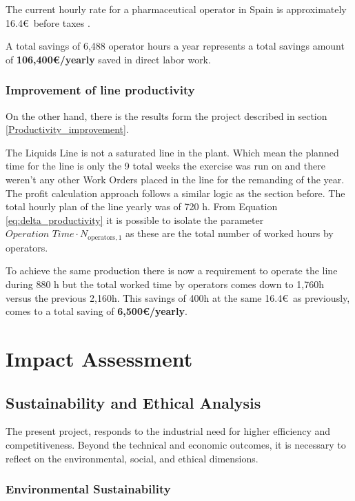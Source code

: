 \documentclass[]{article}
\begin{document}
The current hourly rate for a pharmaceutical operator in Spain is approximately 16.4\euro~before taxes \cite{ccoo_convenio_nodate}.

A total savings of 6,488 operator hours a year represents a total savings amount of \textbf{106,400\euro/yearly} saved in direct labor work.

\subsubsection{Improvement of line productivity}
On the other hand, there is the results form the project described in section \ref{Productivity_improvement}.

The Liquids Line is not a saturated line in the plant. Which mean the planned time for the line is only the 9 total weeks the exercise was run on and there weren't any other Work Orders placed in the line for the remanding of the year.
The profit calculation approach follows a similar logic as the section before. The total hourly plan of the line yearly was of 720 h. From Equation \ref{eq:delta_productivity} it is possible to isolate the parameter $\textit{Operation Time} \cdot \textit{N}_{\mathrm{operators},1}$ as these are the total number of worked hours by operators. 

To achieve the same production there is now a requirement to operate the line during 880 h but the total worked time by operators comes down to 1,760h versus the previous 2,160h. This savings of 400h at the same 16.4\euro~as previously, comes to a total saving of \textbf{6,500\euro/yearly}.

\clearpage
\newpage
\section{Impact Assessment}
\subsection{Sustainability and Ethical Analysis}

The present project, responds to the industrial need for higher efficiency and competitiveness. Beyond the technical and economic outcomes, it is necessary to reflect on the environmental, social, and ethical dimensions. 

\subsubsection{Environmental Sustainability}
\end{document}
